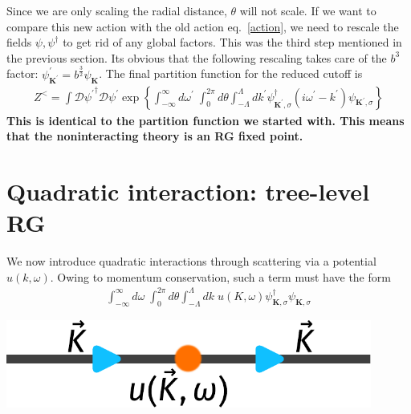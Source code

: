 \documentclass[12pt]{article}
\begin{document}
Since we are only scaling the radial distance, \(\theta\) will not scale. If we want to compare this new action with the old action eq.~\ref{action}, we need to rescale the fields \(\psi,\psi^\dagger\) to get rid of any global factors. This was the third step mentioned in the previous section. Its obvious that the following rescaling takes care of the \(b^3\) factor: \(\psi^\prime_{\mathbf{K}^\prime} = b^{\frac{3}{2}}\psi_\mathbf{K}\). The final partition function for the reduced cutoff is
\begin{equation}\begin{aligned}
	Z^< = \int \mathcal{D}{\psi^\prime}^\dagger \mathcal{D}{\psi^\prime}\exp\left\{\int_{-\infty}^\infty d\omega^\prime\;\int_0^{2\pi} d\theta \int_{-\Lambda}^{\Lambda}dk^\prime\psi_{\mathbf K^\prime,\sigma}^\dagger \left(i\omega^\prime - k^\prime\right)\psi_{\mathbf K^\prime,\sigma}\right\}
\end{aligned}\end{equation}
\textbf{This is identical to the partition function we started with. This means that the noninteracting theory is an RG fixed point.}
\section{Quadratic interaction: tree-level RG}
\begin{minipage}{0.55\textwidth}
We now introduce quadratic interactions through scattering via a potential \(u(k,\omega)\). Owing to momentum conservation, such a term must have the form
\begin{equation}\begin{aligned}
	\int_{-\infty}^\infty d\omega\;\int_0^{2\pi} d\theta \int_{-\Lambda}^{\Lambda}dk \;u(K,\omega)\psi_{\mathbf{K},\sigma}^\dagger\psi_{\mathbf{K},\sigma}
\end{aligned}\end{equation}
\end{minipage}
\hspace*{\fill}
\begin{minipage}{0.3\textwidth}
	\centering
	\includegraphics[width=0.9\textwidth]{./figures/tree_quadratic.pdf}
\end{minipage}
\end{document}
